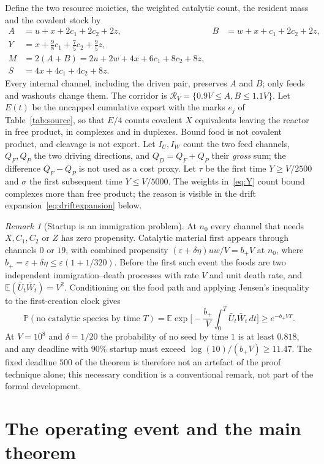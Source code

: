 \documentclass[11pt,a4paper]{article}
\theoremstyle{plain}
\theoremstyle{definition}
\theoremstyle{remark}
\newtheorem{remark}[theorem]{Remark}
\newcommand{\E}{\mathbb E}
\newcommand{\Prob}{\mathbb P}
\newcommand{\R}{\mathcal R_V}
\newcommand{\eps}{\varepsilon}
\begin{document}
Define the two resource moieties, the weighted catalytic count, the resident mass and the covalent stock by
\begin{align}
 A&=u+x+2c_1+2c_2+2z,& B&=w+x+c_1+2c_2+2z,\label{eq:AB}\\
 Y&=x+\tfrac98c_1+\tfrac75c_2+\tfrac95z,\label{eq:Y}\\
 M&=2(A+B)=2u+2w+4x+6c_1+8c_2+8z,\label{eq:M}\\
 S&=4x+4c_1+4c_2+8z.\label{eq:S}
\end{align}
Every internal channel, including the driven pair, preserves $A$ and $B$; only feeds and washouts change them. The corridor is $\R=\{0.9V\le A,B\le1.1V\}$. Let $E(t)$ be the uncapped cumulative export with the marks $e_j$ of Table~\ref{tab:source}, so that $E/4$ counts covalent $X$ equivalents leaving the reactor in free product, in complexes and in duplexes. Bound food is not covalent product, and cleavage is not export. Let $I_U,I_W$ count the two feed channels, $Q_F,Q_P$ the two driving directions, and $Q_D=Q_F+Q_P$ their \emph{gross} sum; the difference $Q_F-Q_P$ is not used as a cost proxy. Let $\tau$ be the first time $Y\ge V/2500$ and $\sigma$ the first subsequent time $Y\le V/5000$. The weights in~\eqref{eq:Y} count bound complexes more than free product; the reason is visible in the drift expansion~\eqref{eq:driftexpansion} below.

\begin{remark}[Startup is an immigration problem]\label{rem:startup}
At $n_0$ every channel that needs $X,C_1,C_2$ or $Z$ has zero propensity. Catalytic material first appears through channels $0$ or $19$, with combined propensity $(\eps+\delta\eta)uw/V=b_+V$ at $n_0$, where $b_+=\eps+\delta\eta\le\eps(1+1/320)$. Before the first such event the foods are two independent immigration--death processes with rate $V$ and unit death rate, and $\E(\bar U_t\bar W_t)=V^2$. Conditioning on the food path and applying Jensen's inequality to the first-creation clock gives
\[
 \Prob(\text{no catalytic species by time }T)=\E\exp\Big[-\frac{b_+}V\int_0^T\bar U_t\bar W_t\,dt\Big]\ge e^{-b_+VT}.
\]
At $V=10^8$ and $\delta=1/20$ the probability of no seed by time $1$ is at least $0.818$, and any deadline with $90\%$ startup must exceed $\log(10)/(b_+V)\ge11.47$. The fixed deadline $500$ of the theorem is therefore not an artefact of the proof technique alone; this necessary condition is a conventional remark, not part of the formal development.
\end{remark}

\section{The operating event and the main theorem}\label{sec:theorem}
\end{document}
